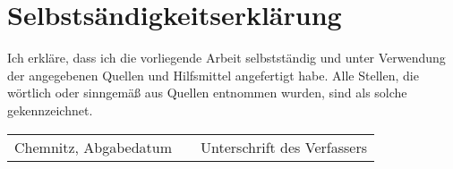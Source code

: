 \section*{Selbstsändigkeitserklärung}

Ich erkläre, dass ich die vorliegende Arbeit selbstständig und unter Verwendung der angegebenen
Quellen und Hilfsmittel angefertigt habe. Alle Stellen, die wörtlich oder sinngemäß aus Quellen
entnommen wurden, sind als solche gekennzeichnet.

\vspace{2cm}

\begin{tabularx}{\columnwidth}{lXr}
  \hline 
  Chemnitz, Abgabedatum &  &Unterschrift des Verfassers
\end{tabularx}
